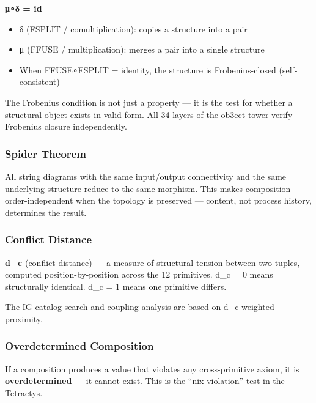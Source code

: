 \textbf{μ∘δ = id}

\begin{itemize}
\tightlist
\item
  δ (FSPLIT / comultiplication): copies a structure into a pair
\item
  μ (FFUSE / multiplication): merges a pair into a single structure
\item
  When FFUSE∘FSPLIT = identity, the structure is Frobenius-closed
  (self-consistent)
\end{itemize}

The Frobenius condition is not just a property --- it is the test for
whether a structural object exists in valid form. All 34 layers of the
ob3ect tower verify Frobenius closure independently.

\hypertarget{spider-theorem}{%
\subsubsection{Spider Theorem}\label{spider-theorem}}

All string diagrams with the same input/output connectivity and the same
underlying structure reduce to the same morphism. This makes composition
order-independent when the topology is preserved --- content,
not process history, determines the result.

\hypertarget{conflict-distance}{%
\subsubsection{Conflict Distance}\label{conflict-distance}}

\textbf{d\_c} (conflict distance) --- a measure of structural tension
between two tuples, computed position-by-position across the 12
primitives. d\_c = 0 means structurally identical. d\_c = 1 means one
primitive differs.

The IG catalog search and coupling analysis are based on d\_c-weighted
proximity.

\hypertarget{overdetermined-composition}{%
\subsubsection{Overdetermined
Composition}\label{overdetermined-composition}}

If a composition produces a value that violates any cross-primitive
axiom, it is \textbf{overdetermined} --- it cannot exist. This is the
``nix violation'' test in the Tetractys.

